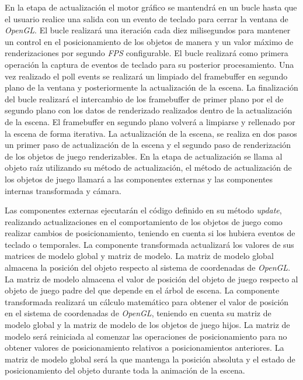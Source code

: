 \documentclass[a4paper]{book}
\begin{document}
En la etapa de actualización el motor gráfico se mantendrá en un bucle hasta que el usuario realice una salida con un evento de teclado
para cerrar la ventana de \textit{OpenGL}. El bucle realizará una iteración cada diez milisegundos para mantener un control en el posicionamiento
de los objetos de manera  y un valor máximo de renderizaciones por segundo \textit{FPS} configurable. El bucle realizará como primera operación
la captura de eventos de teclado para su posterior procesamiento. Una vez realizado el poll events se realizará un limpiado del framebuffer
en segundo plano de la ventana y posteriormente la actualización de la escena. La finalización del bucle realizará el intercambio de los
framebuffer de primer plano por el de segundo plano con los datos de renderizado realizados dentro de la actualización de la escena. El framebuffer
en segundo plano volverá a limpiarse y rellenado por la escena de forma iterativa. La actualización de la escena, se realiza en dos pasos
un primer paso de actualización de la escena y el segundo paso de renderización de los objetos de juego renderizables. En la etapa de
actualización se llama al objeto raíz utilizando su método de actualización, el método de actualización de los objetos de juego llamará
a las componentes externas y las componentes internas transformada y cámara.

Las componentes externas ejecutarán el código definido en su método \textit{update}, realizando actualizaciones en el comportamiento de los objetos
de juego como realizar cambios de posicionamiento, teniendo en cuenta si los hubiera eventos de teclado o temporales. La componente transformada
actualizará los valores de sus matrices de modelo global y matriz de modelo. La matriz de modelo global almacena
la posición del objeto respecto al sistema de coordenadas de \textit{OpenGL}. La matriz de modelo almacena el valor de posición del objeto de juego
respecto al objeto de juego padre del que depende en el árbol de escena. La componente transformada realizará un cálculo matemático para
obtener el valor de posición en el sistema de coordenadas de \textit{OpenGL}, teniendo en cuenta su matriz de modelo global y la matriz de modelo
de los objetos de juego hijos. La matriz de modelo será reiniciada al comenzar las operaciones de posicionamiento para no obtener valores
de posicionamiento relativos a posicionamientos anteriores. La matriz de modelo global será la que mantenga la posición absoluta y el estado
de posicionamiento del objeto durante toda la animación de la escena.
\end{document}
